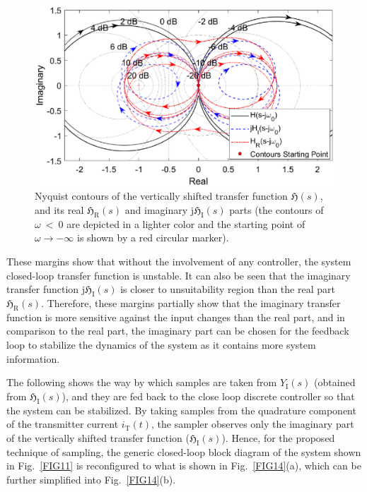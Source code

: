 \documentclass[journal,a4paper,10pt,twoside]{IEEEtran} %
\begin{document}
	 \begin{figure}
	     \centering
	     \includegraphics[clip, trim=1cm 0cm 1cm 0cm, width=1\columnwidth]{FIGS/FIG13.eps}
	     \caption{Nyquist contours of the vertically shifted transfer function $\mathfrak{H}(s)$, and its real $\mathfrak{H}_\mathrm{R}(s)$ and imaginary $\mathrm{j}\mathfrak{H}_\mathrm{I}(s)$ parts (the contours of $\omega~<~0$ are depicted in a lighter color and the starting point of $\omega \rightarrow -\infty$ is shown by a red circular marker).}
	     \label{FIG13}
	     \vspace{-3mm}
	 \end{figure}
	 
	 These margins show that without the involvement of any controller, the system closed-loop transfer function is unstable. It can also be seen that the imaginary transfer function $\mathrm{j}\mathfrak{H}_\mathrm{I}(s)$ is closer to unsuitability region than the real part $\mathfrak{H}_\mathrm{R}(s)$. Therefore, these margins partially show that the imaginary transfer function is more sensitive against the input changes than the real part, and in comparison to the real part, the imaginary part can be chosen for the feedback loop to stabilize the dynamics of the system as it contains more system information.
	 
	 The following shows the way by which samples are taken from $Y_\mathrm{I}(s)$ (obtained from $\mathfrak{H}_\mathrm{I}(s)$), and they are fed back to the close loop discrete controller so that the system can be stabilized. By taking samples from the quadrature component of the transmitter current $i_\mathrm{T}(t)$, the sampler observes only the imaginary part of the vertically shifted transfer function ($\mathfrak{H}_\mathrm{I}(s)$). Hence, for the proposed technique of sampling, the generic closed-loop block diagram of the system shown in Fig.~\ref{FIG11} is reconfigured to what is shown in Fig.~\ref{FIG14}(a), which can be further simplified into Fig.~\ref{FIG14}(b).
	 
\end{document}
